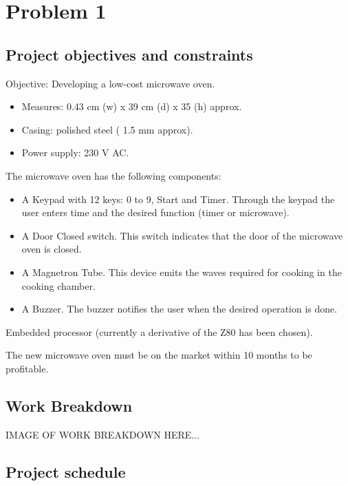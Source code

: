 \chapter{Problem 1}
\label{chp:intro}

\section{Project objectives and constraints}

Objective: Developing a low-cost microwave oven. 

\begin{itemize}
	\item Measures: 0.43 cm (w) x 39 cm (d) x 35 (h) approx.
	\item Casing: polished steel ( 1.5 mm approx).
	\item Power supply: 230 V AC.
\end{itemize}

The microwave oven has the following components:

\begin{itemize}
	\item A Keypad with 12 keys: 0 to 9, Start and Timer. Through the keypad the user enters
	time and the desired function (timer or microwave).

	\item A Door Closed switch. This switch indicates that the door of the microwave oven is
	closed.

	\item A Magnetron Tube. This device emits the waves required for cooking in the cooking
	chamber.
	
	\item A Buzzer. The buzzer notifies the user when the desired operation is done.
\end{itemize}

Embedded processor (currently a derivative of the Z80 has been chosen).

The new microwave oven must be on the market within 10 months to be profitable.

\section{Work Breakdown}
IMAGE OF WORK BREAKDOWN HERE...

\section{Project schedule}